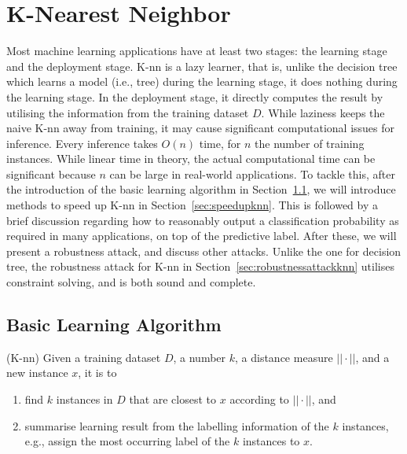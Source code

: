\newpage

\chapter{K-Nearest Neighbor}

Most machine learning applications have at least two stages: the learning stage and the deployment stage. 
K-nn is a lazy learner, that is, unlike the decision tree which learns a model (i.e., tree) during the learning stage, it does nothing during the learning stage. 
%
In the deployment stage, it directly computes the result by utilising the information from the training dataset $D$. 
%
While laziness keeps the naive K-nn away from training, it may cause significant computational issues for inference. Every inference takes $O(n)$ time, for $n$ the number of training instances. While linear time in theory, the actual computational time can be significant because $n$ can be large in real-world applications. To tackle this, after the introduction of the basic learning algorithm in Section~\ref{sec:basicknn}, we will introduce methods to speed up K-nn in Section~\ref{sec:speedupknn}. This is followed by a brief discussion regarding how to reasonably output a classification probability as required in many applications, on top of the predictive label. After these, we will present a robustness attack, and discuss other attacks. Unlike the one for decision tree, the robustness attack for K-nn in Section~\ref{sec:robustnessattackknn} utilises constraint solving, and is both sound and complete. 


\section{Basic Learning Algorithm}\label{sec:basicknn}

\begin{definition}
(K-nn) Given a training dataset $D$, a number $k$, a distance measure $||\cdot||$, and a new instance $x$, it is to 
\begin{enumerate}
    \item find $k$ instances in $D$ that are closest to $x$ according to $||\cdot||$, and 
    \item summarise learning result from the labelling information of the $k$ instances, e.g., assign the most occurring label of the $k$ instances to $x$. 
\end{enumerate}
\end{definition}

